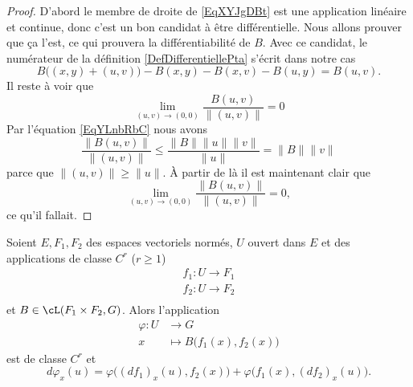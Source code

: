 \begin{proof}
    D'abord le membre de droite de \eqref{EqXYJgDBt} est une application linéaire et continue, donc c'est un bon candidat à être différentielle. Nous allons prouver que ça l'est, ce qui prouvera la différentiabilité de \( B\). Avec ce candidat, le numérateur de la définition \eqref{DefDifferentiellePta} s'écrit dans notre cas
    \begin{equation}
        B\big( (x,y)+(u,v) \big)-B(x,y)-B(x,v)-B(u,y)=B(u,v).
    \end{equation}
    Il reste à voir que
    \begin{equation}
        \lim_{ (u,v)\to (0,0) } \frac{ B(u,v) }{ \| (u,v) \| }=0
    \end{equation}
    Par l'équation \eqref{EqYLnbRbC} nous avons
    \begin{equation}
        \frac{ \| B(u,v) \| }{ \| (u,v) \| }\leq \frac{ \| B \|\| u \|\| v \| }{ \| u \| }=\| B \|\| v \|
    \end{equation}
    parce que \( \| (u,v) \|\geq \| u \|\). À partir de là il est maintenant clair que
    \begin{equation}
        \lim_{(u,v)\to (0,0)}\frac{ \| B(u,v) \| }{ \| (u,v) \| }=0,
    \end{equation}
    ce qu'il fallait.
\end{proof}

\begin{proposition}
    Soient \( E,F_1,F_2\) des espaces vectoriels normés, \( U\) ouvert dans \( E\) et des applications de classe \( C^r\) (\( r\geq 1\))
    \begin{subequations}
        \begin{align}
            f_1\colon U\to F_1\\
            f_2\colon U\to F_2\\
        \end{align}
    \end{subequations}
    et \( B\in\cL(F_1\times F_2,G)\). Alors l'application
    \begin{equation}
        \begin{aligned}
            \varphi\colon U&\to G \\
            x&\mapsto B\big( f_1(x),f_2(x) \big)
        \end{aligned}
    \end{equation}
    est de classe \( C^r\) et
    \begin{equation}    \label{EqMNGBXWc}
        d\varphi_x(u)=\varphi\big( (df_1)_x(u),f_2(x) \big)+\varphi\big( f_1(x),(df_2)_x(u) \big).
    \end{equation}
\end{proposition}

